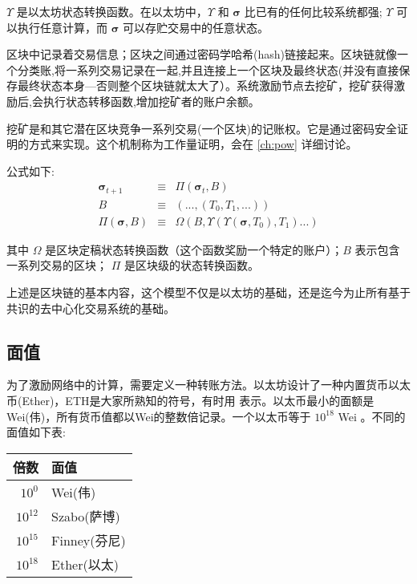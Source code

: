 \documentclass[9pt,oneside]{amsart}
\begin{document}
\begin{multicols}{2}
$\Upsilon$ 是以太坊状态转换函数。在以太坊中，$\Upsilon$ 和 $\boldsymbol{\sigma}$ 比已有的任何比较系统都强; $\Upsilon$ 可以执行任意计算，而 $\boldsymbol{\sigma}$  可以存贮交易中的任意状态。

区块中记录着交易信息；区块之间通过密码学哈希(hash)链接起来。区块链就像一个分类账,将一系列交易记录在一起,并且连接上一个区块及最终状态(并没有直接保存最终状态本身---否则整个区块链就太大了）。系统激励节点去挖矿，挖矿获得激励后,会执行状态转移函数,增加挖矿者的账户余额。

挖矿是和其它潜在区块竞争一系列交易(一个区块)的记账权。它是通过密码安全证明的方式来实现。这个机制称为工作量证明，会在  \ref{ch:pow} 详细讨论。

公式如下:
\begin{eqnarray}
\boldsymbol{\sigma}_{t+1} & \equiv & \Pi(\boldsymbol{\sigma}_t, B) \\
B & \equiv & (..., (T_0, T_1, ...) ) \\
\Pi(\boldsymbol{\sigma}, B) & \equiv & \Omega(B, \Upsilon(\Upsilon(\boldsymbol{\sigma}, T_0), T_1) ...)
\end{eqnarray}

其中 $\Omega$ 是区块定稿状态转换函数（这个函数奖励一个特定的账户）；$B$ 表示包含一系列交易的区块； $\Pi$ 是区块级的状态转换函数。

上述是区块链的基本内容，这个模型不仅是以太坊的基础，还是迄今为止所有基于共识的去中心化交易系统的基础。


\subsection{面值}

为了激励网络中的计算，需要定义一种转账方法。以太坊设计了一种内置货币以太币(Ether)，ETH是大家所熟知的符号，有时用 \DH{} 表示。以太币最小的面额是Wei(伟)，所有货币值都以Wei的整数倍记录。一个以太币等于 $10^{18}$ Wei 。不同的面值如下表:

\par
\begin{center}
\begin{tabular}{rl}
\toprule
倍数 & 面值 \\
\midrule
$10^0$ & Wei(伟) \\
$10^{12}$ & Szabo(萨博) \\
$10^{15}$ & Finney(芬尼) \\
$10^{18}$ & Ether(以太) \\
\bottomrule
\end{tabular}
\end{center}
\par


\end{multicols}
\end{document}
